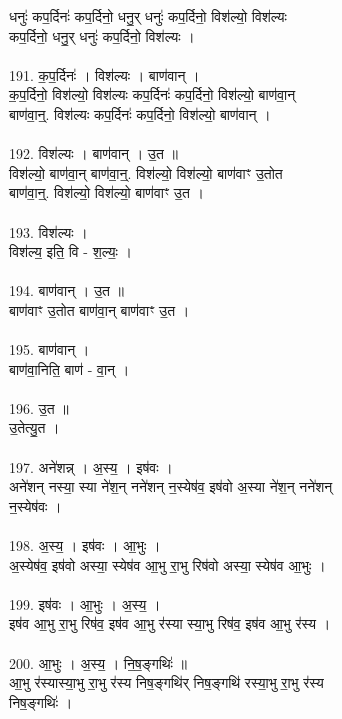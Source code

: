 धनुः॑ कप॒र्दिनः॑ कप॒र्दिनो॒ धनु॒र् धनुः॑ कप॒र्दिनो॒ विश॑ल्यो॒ विश॑ल्यः\\
कप॒र्दिनो॒ धनु॒र् धनुः॑ कप॒र्दिनो॒ विश॑ल्यः ।\\
\\
191. क॒प॒र्दिनः॑ । विश॑ल्यः । बाण॑वान् ।\\
क॒प॒र्दिनो॒ विश॑ल्यो॒ विश॑ल्यः कप॒र्दिनः॑ कप॒र्दिनो॒ विश॑ल्यो॒ बाण॑वा॒न्\\
बाण॑वा॒न्॒. विश॑ल्यः कप॒र्दिनः॑ कप॒र्दिनो॒ विश॑ल्यो॒ बाण॑वान् ।\\
\\
192. विश॑ल्यः । बाण॑वान् । उ॒त ॥\\
विश॑ल्यो॒ बाण॑वा॒न् बाण॑वा॒न्॒. विश॑ल्यो॒ विश॑ल्यो॒ बाण॑वाꣳ उ॒तोत\\
बाण॑वा॒न्॒. विश॑ल्यो॒ विश॑ल्यो॒ बाण॑वाꣳ उ॒त ।\\
\\
193. विश॑ल्यः ।\\
विश॑ल्य॒ इति॒ वि - श॒ल्यः॒ ।\\
\\
194. बाण॑वान् । उ॒त ॥\\
बाण॑वाꣳ उ॒तोत बाण॑वा॒न् बाण॑वाꣳ उ॒त ।\\
\\
195. बाण॑वान् ।\\
बाण॑वा॒निति॒ बाण॑ - वा॒न् ।\\
\\
196. उ॒त ॥\\
उ॒तेत्यु॒त ।\\
\\
197. अने॑शन्न् । अ॒स्य॒ । इष॑वः ।\\
अने॑शन् नस्या॒ स्या ने॑श॒न् नने॑शन् न॒स्येष॑व॒ इष॑वो अ॒स्या ने॑श॒न् नने॑शन्\\
न॒स्येष॑वः ।\\
\\
198. अ॒स्य॒ । इष॑वः । आ॒भुः ।\\
अ॒स्येष॑व॒ इष॑वो अस्या॒ स्येष॑व आ॒भु रा॒भु रिष॑वो अस्या॒ स्येष॑व आ॒भुः ।\\
\\
199. इष॑वः । आ॒भुः । अ॒स्य॒ ।\\
इष॑व आ॒भु रा॒भु रिष॑व॒ इष॑व आ॒भु र॑स्या स्या॒भु रिष॑व॒ इष॑व आ॒भु र॑स्य ।\\
\\
200. आ॒भुः । अ॒स्य॒ । नि॒ष॒ङ्गथिः॑ ॥\\
आ॒भु र॑स्यास्या॒भु रा॒भु र॑स्य निष॒ङ्गथि॑र् निष॒ङ्गथि॑ रस्या॒भु रा॒भु र॑स्य\\
निष॒ङ्गथिः॑ ।\\
\\
